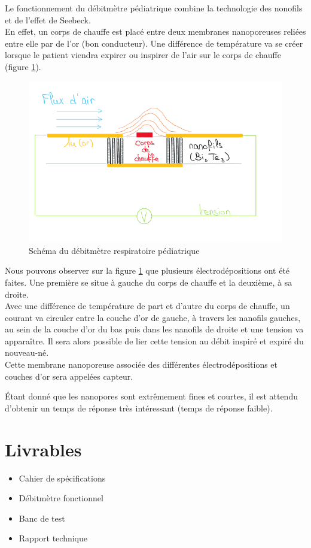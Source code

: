 Le fonctionnement du débitmètre pédiatrique combine la technologie des nonofils et de l'effet de Seebeck. \\
En effet, un corps de chauffe est placé entre deux membranes nanoporeuses reliées entre elle par de l'or (bon conducteur). Une différence de 
température va se créer lorsque le patient viendra expirer ou inspirer de l'air sur le corps de chauffe (figure \ref{fig:CapteurFUN}). 
\begin{figure}[H]
    \centering
    \includegraphics[scale = 0.7]{images/CapteurFUN.png}
    \caption{Schéma du débitmètre respiratoire pédiatrique}
    \label{fig:CapteurFUN}
\end{figure}
Nous pouvons observer sur la figure \ref{fig:CapteurFUN} que plusieurs électrodépositions ont été faites. Une première se situe à gauche 
du corps de chauffe et la deuxième, à sa droite. \\
Avec une différence de température de part et d'autre du corps de chauffe, un courant va circuler entre la couche d'or de gauche, à 
travers les nanofils gauches, au sein de la couche d'or du bas puis dans les nanofils de droite et une tension va apparaître. Il sera 
alors possible de lier cette tension au débit inspiré et expiré du nouveau-né.\\
Cette membrane nanoporeuse associée des différentes électrodépositions et couches d'or sera appelées \gls{capteur}. 

Étant donné que les nanopores sont extrêmement fines et courtes, il est attendu d'obtenir un temps de réponse très intéressant (temps 
de réponse faible). 

\section{Livrables}
\begin{itemize}
    \item Cahier de spécifications
    \item Débitmètre fonctionnel
    \item Banc de test
    \item Rapport technique
\end{itemize}
